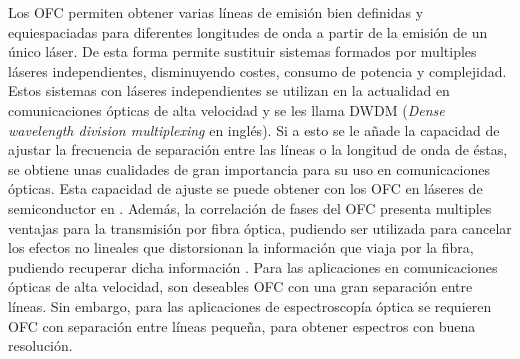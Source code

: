 		Los OFC permiten obtener varias l\'ineas de emisi\'on bien definidas y equiespaciadas para diferentes longitudes de onda a partir de la emisi\'on de un \'unico l\'aser. De esta forma permite sustituir sistemas formados por multiples l\'aseres independientes, disminuyendo costes, consumo de potencia y complejidad. Estos sistemas con láseres independientes se utilizan en la actualidad en comunicaciones ópticas de alta velocidad y se les llama DWDM (\textit{Dense wavelength division multiplexing} en inglés). Si a esto se le añade la capacidad de ajustar la frecuencia de separación entre las líneas o la longitud de onda de éstas, se obtiene unas cualidades de gran importancia para su uso en comunicaciones \'opticas. Esta capacidad de ajuste se puede obtener con los OFC en láseres de semiconductor en \gs. Además, la correlación de fases del OFC presenta multiples ventajas para la transmisión por fibra óptica, pudiendo ser utilizada para cancelar los efectos no lineales que distorsionan la información que viaja por la fibra, pudiendo recuperar dicha información \cite{temprana2015overcoming}. Para las aplicaciones en comunicaciones ópticas de alta velocidad, son deseables OFC con una gran separación entre líneas. Sin embargo, para las aplicaciones de espectroscopía óptica se requieren OFC con separación entre líneas pequeña, para obtener espectros con buena resolución.
